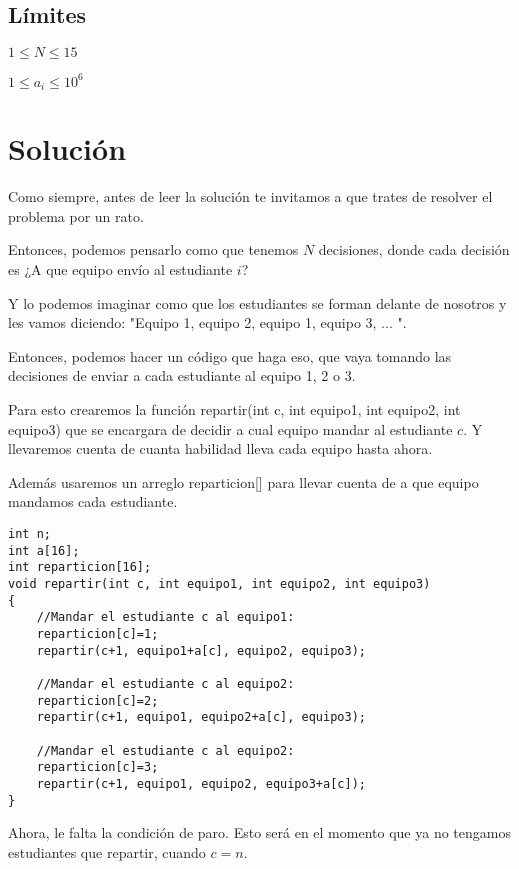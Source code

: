 \subsection*{Límites}
\begin{plimits}
	\item \(1\leq N \leq 15\)
	\item \(1\leq a_i \leq 10^6\)
\end{plimits}

\section*{Solución}

Como siempre, antes de leer la solución te invitamos a que trates de resolver el problema por un rato.

Entonces, podemos pensarlo como que tenemos \(N\) decisiones, donde cada decisión es ¿A que equipo envío al estudiante \(i\)?

Y lo podemos imaginar como que los estudiantes se forman delante de nosotros y les vamos diciendo: "Equipo 1, equipo 2, equipo 1, equipo 3, ... ".

Entonces, podemos hacer un código que haga eso, que vaya tomando las decisiones de enviar a cada estudiante al equipo 1, 2 o 3.

Para esto crearemos la función repartir(int c, int equipo1, int equipo2, int equipo3) que se encargara de decidir a cual equipo mandar al estudiante \(c\). 
Y llevaremos cuenta de cuanta habilidad lleva cada equipo hasta ahora.

Además usaremos un arreglo reparticion[] para llevar cuenta de a que equipo mandamos cada estudiante.

\begin{lstlisting}
int n;
int a[16];
int reparticion[16];
void repartir(int c, int equipo1, int equipo2, int equipo3) 
{
	//Mandar el estudiante c al equipo1:
	reparticion[c]=1;
	repartir(c+1, equipo1+a[c], equipo2, equipo3);
	
	//Mandar el estudiante c al equipo2:
	reparticion[c]=2;
	repartir(c+1, equipo1, equipo2+a[c], equipo3);
	
	//Mandar el estudiante c al equipo2:
	reparticion[c]=3;
	repartir(c+1, equipo1, equipo2, equipo3+a[c]);
}
\end{lstlisting}

Ahora, le falta la condición de paro. Esto será en el momento que ya no tengamos estudiantes que repartir, cuando \(c=n\).


